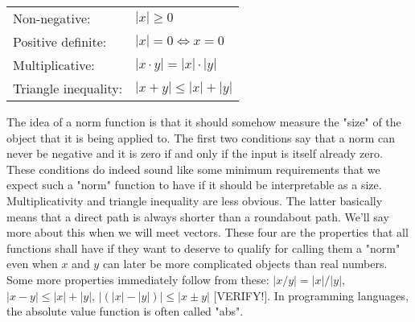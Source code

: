 \medskip
\begin{tabular}{l l}
\label{Tab:Norm}
Non-negative:         & $|x| \geq 0$  \\
Positive definite:    & $|x| = 0 \Leftrightarrow x = 0$  \\
Multiplicative:       & $|x \cdot y| = |x| \cdot |y| $  \\
Triangle inequality:  & $|x + y| \leq |x| + |y| $
\end{tabular}
\medskip

The idea of a norm function is that it should somehow measure the "size" of the object that it is being applied to. The first two conditions say that a norm can never be negative and it is zero if and only if the input is itself already zero. These conditions do indeed sound like some minimum requirements that we expect such a "norm" function to have if it should be interpretable as a size. Multiplicativity and triangle inequality are less obvious. The latter basically means that a direct path is always shorter than a roundabout path. We'll say more about this when we will meet vectors. These four are the properties that all functions shall have if they want to deserve to qualify for calling them a "norm" even when $x$ and $y$ can later be more complicated objects than real numbers. Some more properties immediately follow from these: $|x/y| = |x|/|y|$, $|x-y| \leq |x| + |y|$, $\bigl| (|x|-|y|) \bigr| \leq |x \pm y|$ [VERIFY!]. In programming languages, the absolute value function is often called "abs". %

